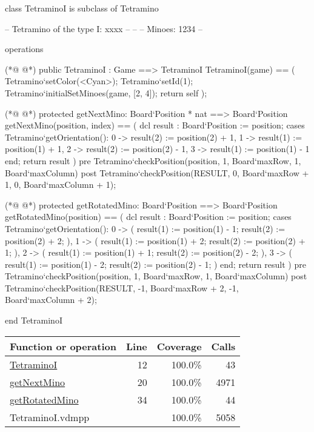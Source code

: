 \begin{vdmpp}[breaklines=true]
class TetraminoI is subclass of Tetramino

 -- Tetramino of the type I: xxxx
 -- 
 --
 -- Minoes:         1234
 -- 
 
  
 operations
 
(*@
\label{TetraminoI:12}
@*)
  public TetraminoI : Game ==> TetraminoI
  TetraminoI(game) == (
   Tetramino`setColor(<Cyan>);
   Tetramino`setId(1);
   Tetramino`initialSetMinoes(game, [2, 4]);
   return self
  );
  
(*@
\label{getNextMino:20}
@*)
  protected getNextMino: Board`Position * nat ==> Board`Position
  getNextMino(position, index) == (
   dcl result : Board`Position := position;
   cases Tetramino`getOrientation():
    0 -> result(2) := position(2) + 1,
    1 -> result(1) := position(1) + 1,
    2 -> result(2) := position(2) - 1,
    3 -> result(1) := position(1) - 1
   end;
   return result
  )
  pre Tetramino`checkPosition(position, 1, Board`maxRow, 1, Board`maxColumn)
  post Tetramino`checkPosition(RESULT, 0, Board`maxRow + 1, 0, Board`maxColumn + 1);
  
(*@
\label{getRotatedMino:34}
@*)
  protected getRotatedMino: Board`Position ==> Board`Position
  getRotatedMino(position) == (
   dcl result : Board`Position := position;
   cases Tetramino`getOrientation():
    0 -> (
     result(1) := position(1) - 1; 
     result(2) := position(2) + 2;
     ),
    1 -> (
     result(1) := position(1) + 2; 
     result(2) := position(2) + 1;
     ),
    2 -> (
     result(1) := position(1) + 1; 
     result(2) := position(2) - 2;
     ),
    3 -> (
     result(1) := position(1) - 2; 
     result(2) := position(2) - 1;
     )
   end;
   return result
  )
  pre Tetramino`checkPosition(position, 1, Board`maxRow, 1, Board`maxColumn)
  post Tetramino`checkPosition(RESULT, -1, Board`maxRow + 2, -1, Board`maxColumn + 2); 
  
      
end TetraminoI
\end{vdmpp}
\bigskip
\begin{longtable}{|l|r|r|r|}
\hline
Function or operation & Line & Coverage & Calls \\
\hline
\hline
\hyperref[TetraminoI:12]{TetraminoI} & 12&100.0\% & 43 \\
\hline
\hyperref[getNextMino:20]{getNextMino} & 20&100.0\% & 4971 \\
\hline
\hyperref[getRotatedMino:34]{getRotatedMino} & 34&100.0\% & 44 \\
\hline
\hline
TetraminoI.vdmpp & & 100.0\% & 5058 \\
\hline
\end{longtable}

